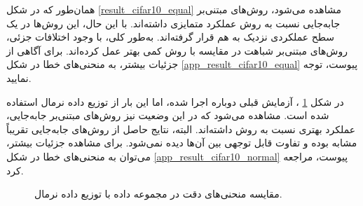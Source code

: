 همان‌طور که در شکل
\ref{result_cifar10_equal}
مشاهده می‌شود، روش‌های مبتنی‌بر جابه‌جایی نسبت به روش
عملکرد متمایزی داشته‌اند. با این حال، این روش‌ها در یک سطح عملکردی نزدیک به هم قرار گرفته‌اند. به‌طور کلی، با وجود اختلافات جزئی، روش‌های مبتنی‌بر شباهت در مقایسه با روش
کمی بهتر عمل کرده‌اند. برای آگاهی از جزئیات بیشتر، به منحنی‌های خطا در شکل
\ref{app_result_cifar10_equal}
پیوست، توجه نمایید.


در شکل
\ref{result_cifar10_normal}%
، آزمایش قبلی دوباره اجرا شده، اما این بار از توزیع داده نرمال استفاده شده است. مشاهده می‌شود که در این وضعیت نیز روش‌های مبتنی‌بر جابه‌جایی، عملکرد بهتری نسبت به روش
داشته‌اند. البته، نتایج حاصل از روش‌های جابه‌جایی تقریباً مشابه بوده و تفاوت قابل توجهی بین آن‌ها دیده نمی‌شود. برای مشاهده جزئیات بیشتر، می‌توان به منحنی‌های خطا در شکل
\ref{app_result_cifar10_normal}
پیوست، مراجعه کرد.

\begin{figure}[t]
	\centering
	\hspace{0.8mm}
	\caption{
		مقایسه منحنی‌های دقت در مجموعه داده
		با توزیع داده نرمال.
	}
	\label{result_cifar10_normal}
\end{figure}





